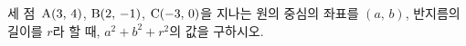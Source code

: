 세 점~$\mathrm{A}(3,\,4)$, $\mathrm{B}(2,\,-1)$, $\mathrm{C}(-3,\,0)$을 지나는 원의 중심의 좌표를 $(a,\,b)$, 반지름의 길이를 $r$라 할 때, $a^2+b^2+r^2$의 값을 구하시오.
